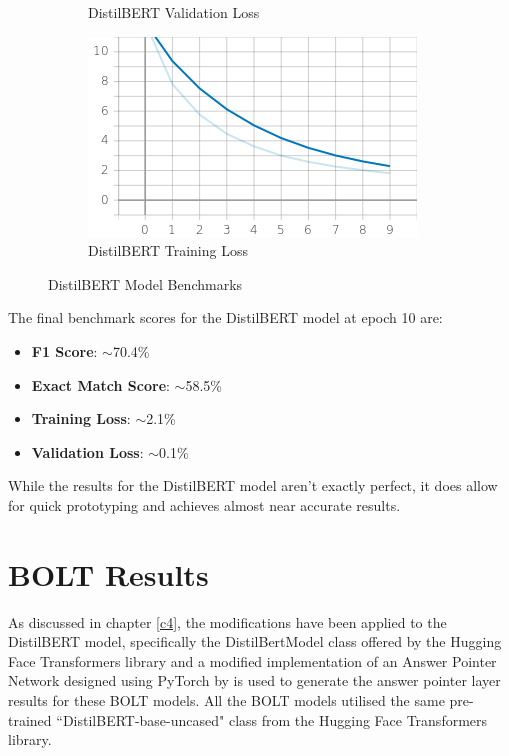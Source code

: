 \documentclass[a4paper,12pt]{report}
\begin{document}
\begin{figure}
\begin{subfigure}[b]{0.4\textwidth}
		\caption{\small DistilBERT Validation Loss}
		\label{distilbertValLoss}
	\end{subfigure}
	\hfill
	\begin{subfigure}[b]{0.4\textwidth}
		\centering
		\includegraphics[width=\textwidth]{../images/Distilbert_Train_Loss.png}
		\caption{\small DistilBERT Training Loss}
		\label{distilbertTrainloss}
	\end{subfigure}
	\caption{DistilBERT Model Benchmarks}
	\label{distilbertBenchmarks}
\end{figure}

	The final benchmark scores for the DistilBERT model at epoch 10 are:
\begin{itemize}
	\item \textbf{F1 Score}:  $\sim$70.4\%
	\item \textbf{Exact Match Score}: $\sim$58.5\%
	\item \textbf{Training Loss}:  $\sim$2.1\%
	\item \textbf{Validation Loss}: $\sim$0.1\%
\end{itemize}

While the results for the DistilBERT model aren't exactly perfect, it does allow for quick prototyping and achieves almost near accurate results.


\section{BOLT Results}\label{c52}


	As discussed in chapter \ref{c4}, the modifications have been applied to the DistilBERT model, specifically the DistilBertModel class offered by the Hugging Face Transformers library \citep{hfTransformers} and a modified implementation of an Answer Pointer Network designed using PyTorch by \citep{pointernetGit} is used to generate the answer pointer layer results for these BOLT models. All the BOLT models utilised the same pre-trained ``DistilBERT-base-uncased" class from the Hugging Face Transformers library.
\end{document}
